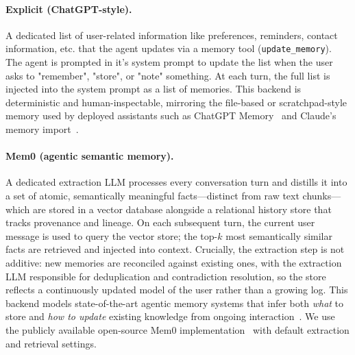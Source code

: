 \documentclass[sigconf]{acmart}
\begin{document}
\paragraph{Explicit (ChatGPT-style).}
A dedicated list of user-related information like preferences, reminders, contact information, etc. that the agent
updates via a memory tool (\texttt{update\_memory}).
The agent is prompted in it's system prompt to update the list when the user asks to "remember", "store", or "note" something.
At each turn, the full list is injected into the system prompt as a list of memories.
This backend is deterministic and human-inspectable, mirroring the
file-based or scratchpad-style memory used by deployed assistants such as
ChatGPT Memory~\cite{openai2024memory} and Claude's memory
import~\cite{anthropic2025memory}.

\paragraph{Mem0 (agentic semantic memory).}
A dedicated extraction LLM processes every conversation turn and distills it
into a set of atomic, semantically meaningful facts---distinct from raw text
chunks---which are stored in a vector database alongside
a relational history store that tracks provenance and lineage.
On each subsequent turn, the current user message is used to query the vector
store; the top-$k$ most semantically similar facts are retrieved and
injected into context.
Crucially, the extraction step is not additive: new memories are reconciled
against existing ones, with the extraction LLM responsible for deduplication
and contradiction resolution, so the store reflects a continuously updated
model of the user rather than a growing log.
This backend models state-of-the-art agentic memory systems that infer
both \emph{what} to store and \emph{how to update} existing knowledge from
ongoing interaction~\citep{chhikara2025mem0}.
We use the publicly available open-source Mem0
implementation~\citep{chhikara2025mem0} with default extraction and
retrieval settings.

\end{document}
